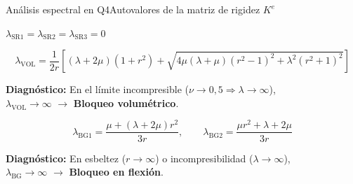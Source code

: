 \documentclass[10pt, aspectratio=43]{beamer}
\begin{document}
\begin{frame}{Análisis espectral en Q4}{Autovalores de la matriz de rigidez $K^e$}
  \begin{uicard}[title=Modos de sólido rígido, top=2pt, bottom=2pt, left=6pt, right=6pt, attach title to upper={\par\vspace{0.05cm}}]
    \small
    \centering
    $\lambda_{\text{SR1}} = \lambda_{\text{SR2}} = \lambda_{\text{SR3}} = 0$ 
  \end{uicard}

  \vspace{0.05cm}

  \begin{uicard}[title=Modo volumétrico, top=2pt, bottom=2pt, left=6pt, right=6pt, attach title to upper={\par\vspace{0.05cm}}]
    \footnotesize
    $$\lambda_{\text{VOL}} = \frac{1}{2r}\left[(\lambda+2\mu)(1+r^2) + \sqrt{4\mu(\lambda+\mu)(r^2-1)^2 + \lambda^2(r^2+1)^2}\right]$$
    \vspace{-0.1cm}
    \begin{center}
      \textbf{Diagnóstico:} En el límite incompresible ($\nu \to 0,5 \Rightarrow \lambda \to \infty$),\\
      \textcolor{YellowBC}{$\lambda_{\text{VOL}} \to \infty$} $\to$ \textbf{Bloqueo volumétrico}.
    \end{center}
  \end{uicard}

  \vspace{0.05cm}

  \begin{uicard}[title=Modos de flexión \quad {\small($r = h/b$)}, top=2pt, bottom=2pt, left=6pt, right=6pt, attach title to upper={\par\vspace{0.05cm}}]
    \footnotesize
    $$\lambda_{\text{BG1}} = \frac{\mu + (\lambda+2\mu)r^2}{3r}, \qquad \lambda_{\text{BG2}} = \frac{\mu r^2 + \lambda + 2\mu}{3r}$$
    \vspace{-0.1cm}
    \begin{center}
      \textbf{Diagnóstico:} En esbeltez ($r \to \infty$) o incompresibilidad ($\lambda \to \infty$),\\
      \textcolor{YellowBC}{$\lambda_{\text{BG}} \to \infty$} $\to$ \textbf{Bloqueo en flexión}.
    \end{center}
  \end{uicard}
\end{frame}
\end{document}
